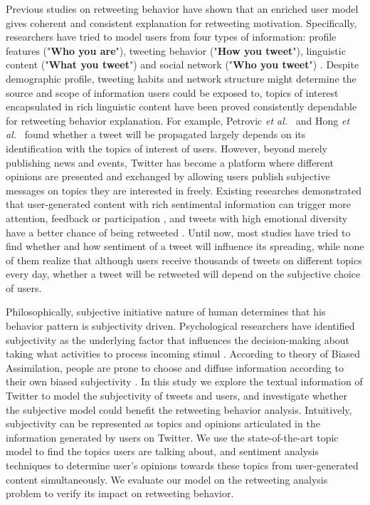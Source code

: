 \documentclass{acm_proc_article-sp}
\begin{document}
Previous studies on retweeting behavior have shown that an enriched user model gives coherent and consistent explanation for retweeting motivation\cite{Abel:2011AUM,conf/icwsm/MacskassyM11,conf/wsdm/FengW13}. 
Specifically, researchers have tried to model users from four types of information:
profile features ("\textbf{Who you are}"), tweeting behavior ("\textbf{How you tweet}"), linguistic content ("\textbf{What you tweet}") and social network ("\textbf{Who you tweet}") \cite{Pennacchiotti:icwsm11}. 
Despite demographic profile, tweeting habits and network structure might determine the source and scope of information users could be exposed to, topics of interest encapsulated in rich linguistic content have been proved consistently dependable for retweeting behavior explanation. 
For example, Petrovic \emph{et al.}~\cite{Osborne_Lavrenko_2011} and Hong \emph{et al.}~\cite{ericmedvet:hong2011} found whether a tweet will be propagated largely depends on its identification with the topics of interest of users. 
However, beyond merely publishing news and events, Twitter has become a platform where different opinions are presented and exchanged by allowing users publish subjective messages on topics they are interested in freely. 
Existing researches demonstrated that user-generated content with rich sentimental information can trigger more attention, feedback or participation \cite{DBLP:conf/hicss/StieglitzD12}, and tweets with high emotional diversity have a better chance of being retweeted \cite{conf/icwsm/PfitznerGS12}.
Until now, most studies have tried to find whether and how sentiment of a tweet will influence its spreading, while none of them realize that although users receive thousands of tweets on different topics every day, whether a tweet will be retweeted will depend on the subjective choice of users. 

Philosophically, subjective initiative nature of human determines that his behavior pattern is subjectivity driven.
Psychological researchers have identified subjectivity as the underlying factor that influences the decision-making about taking what activities to process incoming stimul \cite{Moore2008}.
According to theory of Biased Assimilation, people are prone to choose and diffuse information according to their own biased subjectivity \cite{Hyman2000,sunstein2009rumors}. 
In this study we explore the textual information of Twitter to model the subjectivity of tweets and users, and investigate whether the subjective model could benefit the retweeting behavior analysis. 
Intuitively, subjectivity can be represented as topics and opinions articulated in the information generated by users on Twitter.
We use the state-of-the-art topic model to find the topics users are talking about, and sentiment analysis techniques to determine user’s opinions towards these topics from user-generated content simultaneously. 
We evaluate our model on the retweeting analysis problem to verify its impact on retweeting behavior.
\end{document}
